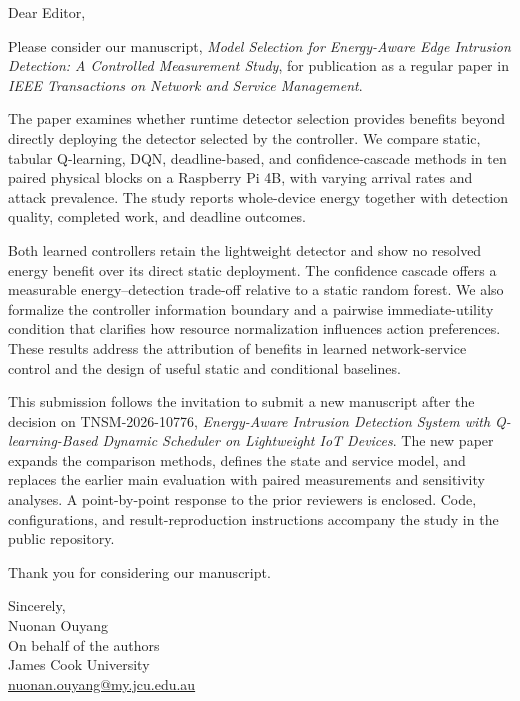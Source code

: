 \documentclass[11pt,a4paper]{article}
\begin{document}
Dear Editor,

Please consider our manuscript, \textit{Model Selection for Energy-Aware Edge Intrusion Detection: A Controlled Measurement Study}, for publication as a regular paper in \textit{IEEE Transactions on Network and Service Management}.

The paper examines whether runtime detector selection provides benefits beyond directly deploying the detector selected by the controller. We compare static, tabular Q-learning, DQN, deadline-based, and confidence-cascade methods in ten paired physical blocks on a Raspberry Pi 4B, with varying arrival rates and attack prevalence. The study reports whole-device energy together with detection quality, completed work, and deadline outcomes.

Both learned controllers retain the lightweight detector and show no resolved energy benefit over its direct static deployment. The confidence cascade offers a measurable energy--detection trade-off relative to a static random forest. We also formalize the controller information boundary and a pairwise immediate-utility condition that clarifies how resource normalization influences action preferences. These results address the attribution of benefits in learned network-service control and the design of useful static and conditional baselines.

This submission follows the invitation to submit a new manuscript after the decision on TNSM-2026-10776, \textit{Energy-Aware Intrusion Detection System with Q-learning-Based Dynamic Scheduler on Lightweight IoT Devices}. The new paper expands the comparison methods, defines the state and service model, and replaces the earlier main evaluation with paired measurements and sensitivity analyses. A point-by-point response to the prior reviewers is enclosed. Code, configurations, and result-reproduction instructions accompany the study in the public repository.

Thank you for considering our manuscript.

Sincerely,\\
Nuonan Ouyang\\
On behalf of the authors\\
James Cook University\\
\href{mailto:nuonan.ouyang@my.jcu.edu.au}{nuonan.ouyang@my.jcu.edu.au}
\end{document}
